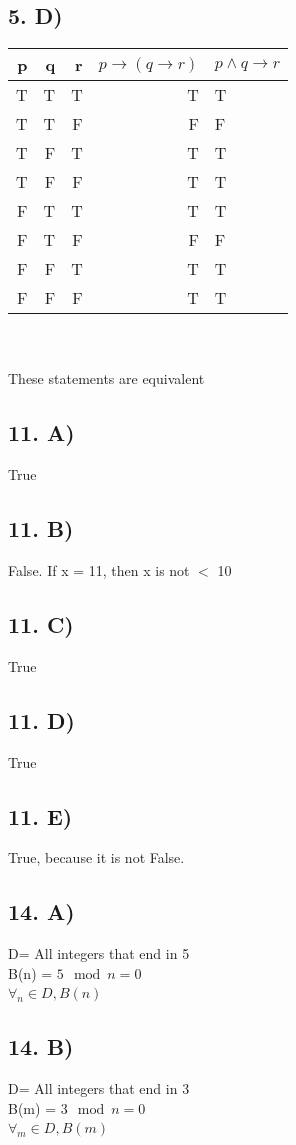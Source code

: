 \documentclass[12]{scrartcl}
\begin{document}
\subsection*{5. D)}
\begin{tabular}{ | r | r | r || r |l |}
p & q & r & $ p \rightarrow (q \rightarrow r) $ & $p \wedge q \rightarrow r$   \\
  \hline                        
  T & T & T & T & T\\
  T & T & F & F & F\\
  T & F & T & T & T\\
  T & F & F & T & T\\
  F & T & T & T & T\\
  F & T & F & F & F\\
  F & F & T & T & T\\
  F & F & F & T & T\\
  \hline  
\end{tabular} \\
\\
These statements are equivalent
\subsection*{11. A)}
True
\subsection*{11. B)}
False. If x = 11, then x is not $<$ 10
\subsection*{11. C)}
True
\subsection*{11. D)}
True
\subsection*{11. E)}
True, because it is not False. 
\subsection*{14. A)}
D= All integers that end in 5\\
B(n) = $5\mod{n} = 0$ \\
$\forall_n \in D, B(n)$\
\subsection*{14. B)}
D= All integers that end in 3\\
B(m) = $3\mod{n} = 0$ \\
$\forall_m \in D, B(m)$\
\end{document}
